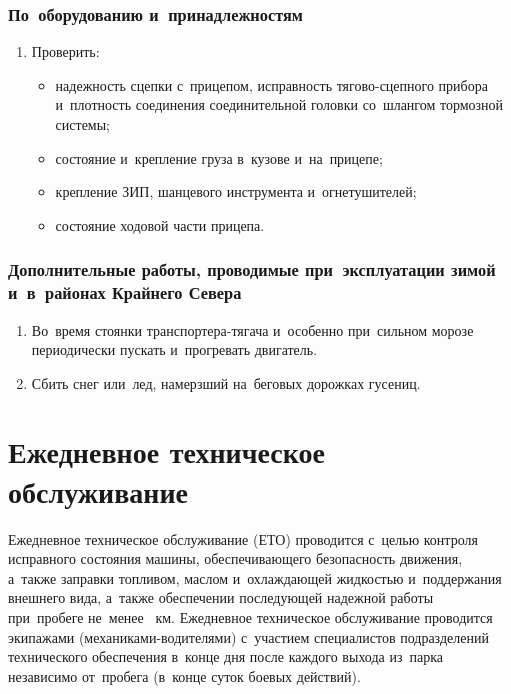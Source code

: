 \subsubsection{По~оборудованию и~принадлежностям}
\begin{enumerate}
    \item Проверить: 
    \begin{itemize}
        \item надежность сцепки с~прицепом, исправность тягово-сцепного прибора и~плотность соединения соединительной головки со~шлангом тормозной системы; 
        \item состояние и~крепление груза в~кузове и~на~прицепе; 
        \item крепление ЗИП, шанцевого инструмента и~огнетушителей; 
        \item состояние ходовой части прицепа. 
    \end{itemize}
\end{enumerate}

\subsubsection{Дополнительные работы, проводимые при~эксплуатации зимой и~в~районах Крайнего Севера}
\begin{enumerate}
    \item Во~время стоянки транспортера-тягача и~особенно при~сильном морозе периодически пускать и~прогревать двигатель. 
    \item Сбить снег или~лед, намерзший на~беговых дорожках гусениц. 

\end{enumerate}



\section{Ежедневное техническое обслуживание}
Ежедневное техническое обслуживание (ЕТО) проводится с~целью контроля исправного состояния машины, обеспечивающего безопасность движения, а~также заправки топливом, маслом и~охлаждающей жидкостью и~поддержания внешнего вида, а~также обеспечении последующей надежной работы при~пробеге не~менее ~км. Ежедневное техническое обслуживание проводится экипажами (механиками-водителями) с~участием специалистов подразделений технического обеспечения в~конце дня после каждого выхода из~парка независимо от~пробега (в~конце суток боевых действий).

